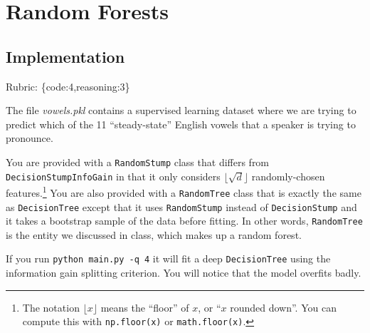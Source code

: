 \documentclass{article}
\def\rubric#1{\gre{Rubric: \{#1\}}}{}
\def\gre#1{{\color{gre}#1}}
\begin{document}
\section{Random Forests}

\subsection{Implementation}
\rubric{code:4,reasoning:3}

The file \emph{vowels.pkl} contains a supervised learning dataset where we are trying to predict which of the 11 ``steady-state'' English vowels that a speaker is trying to pronounce.

You are provided with a \texttt{RandomStump} class that differs from
\texttt{DecisionStumpInfoGain} in that
it only considers $\lfloor \sqrt{d} \rfloor$ randomly-chosen features.\footnote{The notation $\lfloor x\rfloor$ means the ``floor'' of $x$, or ``$x$ rounded down''. You can compute this with \texttt{np.floor(x)} or \texttt{math.floor(x)}.}
You are also provided with a \texttt{RandomTree} class that is exactly the same as
\texttt{DecisionTree} except that it uses \texttt{RandomStump} instead of
\texttt{DecisionStump} and it takes a bootstrap sample of the data before fitting.
In other words, \texttt{RandomTree} is the entity we discussed in class, which
makes up a random forest.

If you run \texttt{python main.py -q 4} it will fit a deep \texttt{DecisionTree}
using the information gain splitting criterion. You will notice that the model overfits badly.
\end{document}

